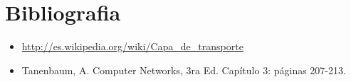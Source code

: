 \newpage
\section{Bibliografia}
\begin{itemize}
 \item \url{http://es.wikipedia.org/wiki/Capa_de_transporte}
 \item Tanenbaum, A. Computer Networks, 3ra Ed. Capítulo 3: páginas 207-213.
\end{itemize}

